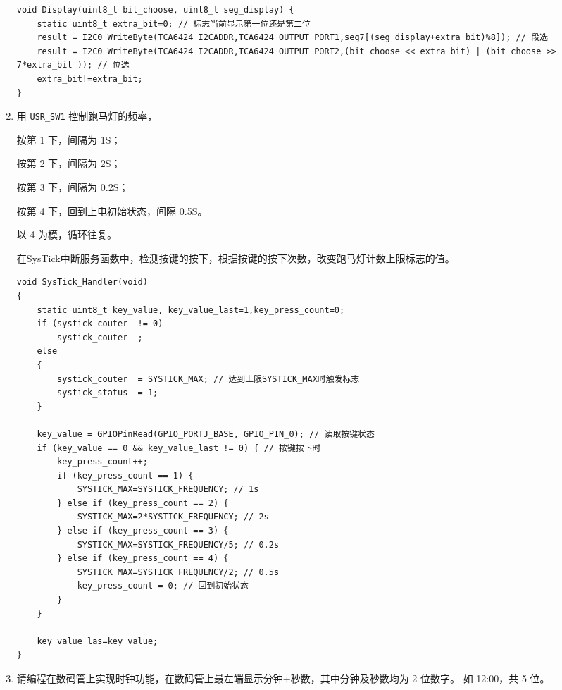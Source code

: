 \documentclass[12pt, a4paper, oneside]{ctexart}
\begin{document}
\begin{enumerate}[listparindent=2em]
    \begin{lstlisting}
void Display(uint8_t bit_choose, uint8_t seg_display) {
    static uint8_t extra_bit=0; // 标志当前显示第一位还是第二位
    result = I2C0_WriteByte(TCA6424_I2CADDR,TCA6424_OUTPUT_PORT1,seg7[(seg_display+extra_bit)%8]); // 段选	
    result = I2C0_WriteByte(TCA6424_I2CADDR,TCA6424_OUTPUT_PORT2,(bit_choose << extra_bit) | (bit_choose >> 7*extra_bit )); // 位选
    extra_bit!=extra_bit; 
}
    \end{lstlisting}

        \item 用 \verb|USR_SW1| 控制跑马灯的频率，
        
        按第 1 下，间隔为 1S；
        
        按第 2 下，间隔为 2S；

        按第 3 下，间隔为 0.2S；
        
        按第 4 下，回到上电初始状态，间隔 0.5S。
        
        以 4 为模，循环往复。

        {\kaishu 在SysTick中断服务函数中，检测按键的按下，根据按键的按下次数，改变跑马灯计数上限标志的值。}

        \begin{lstlisting}
void SysTick_Handler(void)
{
    static uint8_t key_value, key_value_last=1,key_press_count=0;
    if (systick_couter	!= 0)
	    systick_couter--;
    else
    {
	    systick_couter	= SYSTICK_MAX; // 达到上限SYSTICK_MAX时触发标志
	    systick_status 	= 1;
    }

    key_value = GPIOPinRead(GPIO_PORTJ_BASE, GPIO_PIN_0); // 读取按键状态
    if (key_value == 0 && key_value_last != 0) { // 按键按下时
        key_press_count++;
        if (key_press_count == 1) {
            SYSTICK_MAX=SYSTICK_FREQUENCY; // 1s
        } else if (key_press_count == 2) {
            SYSTICK_MAX=2*SYSTICK_FREQUENCY; // 2s
        } else if (key_press_count == 3) {
            SYSTICK_MAX=SYSTICK_FREQUENCY/5; // 0.2s
        } else if (key_press_count == 4) {
            SYSTICK_MAX=SYSTICK_FREQUENCY/2; // 0.5s
            key_press_count = 0; // 回到初始状态
        }
    } 

    key_value_las=key_value;
}
        \end{lstlisting}

        \item 请编程在数码管上实现时钟功能，在数码管上最左端显示分钟+秒数，其中分钟及秒数均为 2 位数字。
        如 12:00，共 5 位。
        

\end{enumerate}
\end{document}
